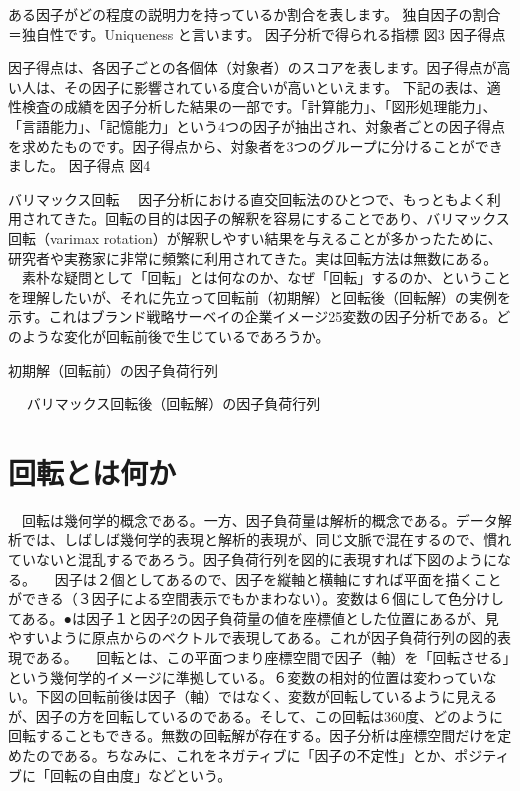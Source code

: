 \documentclass[a4j,11pt,mc]{jreport}
\begin{document}
	ある因子がどの程度の説明力を持っているか割合を表します。
	独自因子の割合＝独自性です。Uniqueness と言います。
	因子分析で得られる指標
	図3
	因子得点

	因子得点は、各因子ごとの各個体（対象者）のスコアを表します。因子得点が高い人は、その因子に影響されている度合いが高いといえます。
	下記の表は、適性検査の成績を因子分析した結果の一部です。「計算能力」、「図形処理能力」、「言語能力」、「記憶能力」という4つの因子が抽出され、対象者ごとの因子得点を求めたものです。因子得点から、対象者を3つのグループに分けることができました。
	因子得点
	図4







	バリマックス回転
	　因子分析における直交回転法のひとつで、もっともよく利用されてきた。回転の目的は因子の解釈を容易にすることであり、バリマックス回転（varimax rotation）が解釈しやすい結果を与えることが多かったために、研究者や実務家に非常に頻繁に利用されてきた。実は回転方法は無数にある。
	　素朴な疑問として「回転」とは何なのか、なぜ「回転」するのか、ということを理解したいが、それに先立って回転前（初期解）と回転後（回転解）の実例を示す。これはブランド戦略サーベイの企業イメージ25変数の因子分析である。どのような変化が回転前後で生じているであろうか。

	初期解（回転前）の因子負荷行列　

	　
	バリマックス回転後（回転解）の因子負荷行列


\section{回転とは何か}
	　回転は幾何学的概念である。一方、因子負荷量は解析的概念である。データ解析では、しばしば幾何学的表現と解析的表現が、同じ文脈で混在するので、慣れていないと混乱するであろう。因子負荷行列を図的に表現すれば下図のようになる。
	　因子は２個としてあるので、因子を縦軸と横軸にすれば平面を描くことができる（３因子による空間表示でもかまわない）。変数は６個にして色分けしてある。●は因子１と因子2の因子負荷量の値を座標値とした位置にあるが、見やすいように原点からのベクトルで表現してある。これが因子負荷行列の図的表現である。
	　回転とは、この平面つまり座標空間で因子（軸）を「回転させる」という幾何学的イメージに準拠している。６変数の相対的位置は変わっていない。下図の回転前後は因子（軸）ではなく、変数が回転しているように見えるが、因子の方を回転しているのである。そして、この回転は360度、どのように回転することもできる。無数の回転解が存在する。因子分析は座標空間だけを定めたのである。ちなみに、これをネガティブに「因子の不定性」とか、ポジティブに「回転の自由度」などという。
\end{document}
